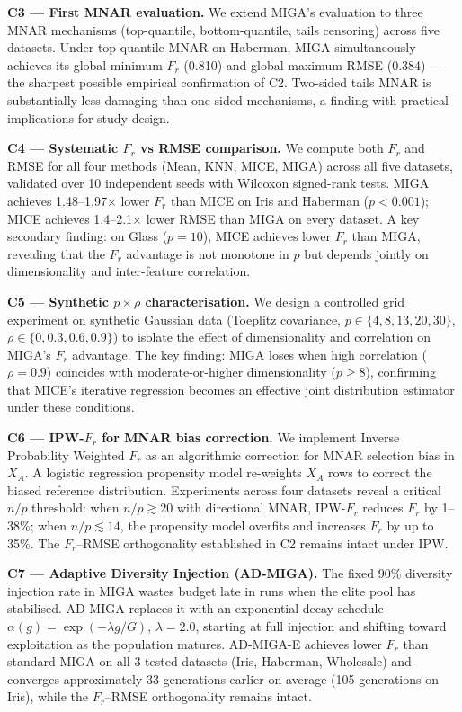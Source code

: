 \textbf{C3 --- First MNAR evaluation.} We extend MIGA's evaluation to three MNAR mechanisms (top-quantile, bottom-quantile, tails censoring) across five datasets. Under top-quantile MNAR on Haberman, MIGA simultaneously achieves its global minimum $F_r$ (0.810) and global maximum RMSE (0.384) --- the sharpest possible empirical confirmation of C2. Two-sided tails MNAR is substantially less damaging than one-sided mechanisms, a finding with practical implications for study design.

\textbf{C4 --- Systematic $F_r$ vs RMSE comparison.} We compute both $F_r$ and RMSE for all four methods (Mean, KNN, MICE, MIGA) across all five datasets, validated over 10 independent seeds with Wilcoxon signed-rank tests. MIGA achieves 1.48--1.97$\times$ lower $F_r$ than MICE on Iris and Haberman ($p < 0.001$); MICE achieves 1.4--2.1$\times$ lower RMSE than MIGA on every dataset. A key secondary finding: on Glass ($p=10$), MICE achieves lower $F_r$ than MIGA, revealing that the $F_r$ advantage is not monotone in $p$ but depends jointly on dimensionality and inter-feature correlation.

\textbf{C5 --- Synthetic $p \times \rho$ characterisation.} We design a controlled grid experiment on synthetic Gaussian data (Toeplitz covariance, $p \in \{4, 8, 13, 20, 30\}$, $\rho \in \{0, 0.3, 0.6, 0.9\}$) to isolate the effect of dimensionality and correlation on MIGA's $F_r$ advantage. The key finding: MIGA loses when high correlation ($\rho = 0.9$) coincides with moderate-or-higher dimensionality ($p \geq 8$), confirming that MICE's iterative regression becomes an effective joint distribution estimator under these conditions.

\textbf{C6 --- IPW-$F_r$ for MNAR bias correction.} We implement Inverse Probability Weighted $F_r$ as an algorithmic correction for MNAR selection bias in $X_A$. A logistic regression propensity model re-weights $X_A$ rows to correct the biased reference distribution. Experiments across four datasets reveal a critical $n/p$ threshold: when $n/p \gtrsim 20$ with directional MNAR, IPW-$F_r$ reduces $F_r$ by 1--38\%; when $n/p \lesssim 14$, the propensity model overfits and increases $F_r$ by up to 35\%. The $F_r$--RMSE orthogonality established in C2 remains intact under IPW.

\textbf{C7 --- Adaptive Diversity Injection (AD-MIGA).} The fixed 90\% diversity injection rate in MIGA wastes budget late in runs when the elite pool has stabilised. AD-MIGA replaces it with an exponential decay schedule $\alpha(g) = \exp(-\lambda g/G)$, $\lambda=2.0$, starting at full injection and shifting toward exploitation as the population matures. AD-MIGA-E achieves lower $F_r$ than standard MIGA on all 3 tested datasets (Iris, Haberman, Wholesale) and converges approximately 33 generations earlier on average (105 generations on Iris), while the $F_r$--RMSE orthogonality remains intact.

